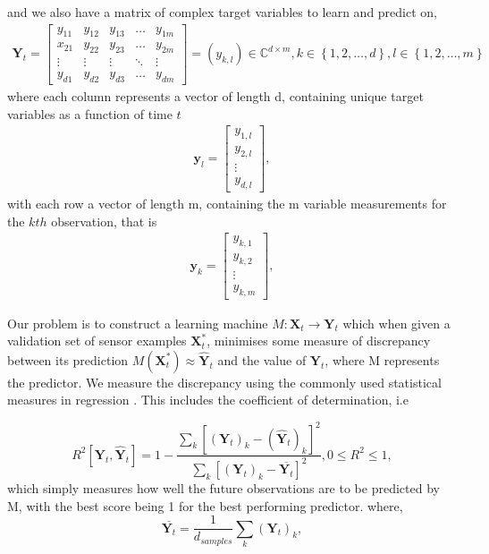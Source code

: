 and we also have a matrix of complex target variables to learn and predict on,
\begin{align*}
\textbf{Y}_{t}=\begin{bmatrix}
    y_{11} & y_{12} & y_{13} & \dots  & y_{1m} \\
    x_{21} & y_{22} & y_{23} & \dots  & y_{2m} \\
    \vdots & \vdots & \vdots & \ddots & \vdots \\
    y_{d1} & y_{d2} & y_{d3} & \dots  & y_{dm}
\end{bmatrix}=(y_{k,l}) \in  \mathbb{C}^{d \times m},  k\in \left\{1,2,\dots, d\right\}, l \in \left\{1,2,\dots,m\right\}
\end{align*}
where each column represents a vector of length d, containing unique target variables as a function of time $t$
\begin{align*}
\textbf{y}_{l}=\begin{bmatrix}
    y_{1,l}  \\
    y_{2,l} \\
    \vdots \\
    y_{d,l} 
\end{bmatrix},
\end{align*} 
with each row a vector of length m, containing the m variable measurements for the $kth$ observation, that is 
\begin{align*}
\textbf{y}_k=\begin{bmatrix}
    y_{k,1}  \\
    y_{k,2} \\
    \vdots \\
    y_{k,m} 
\end{bmatrix},
\end{align*}
 
Our problem is to construct a learning machine $M:\textbf{X}_{t} \rightarrow \textbf{Y}_{t}$ which when given a validation set of sensor examples $\textbf{X}^*_{t}$, minimises some measure of discrepancy between its prediction $M(\textbf{X}^*_{t})\approx\widehat{\textbf{Y}}_{t}$ and the value of $\textbf{Y}_{t}$, where M represents the predictor. We measure the discrepancy using the commonly used statistical measures in regression \citep{borchani2015survey}. This includes the coefficient of determination, i.e

\begin{equation}
R^2\left[\textbf{Y}_{t},\widehat{\textbf{Y}}_{t}\right]=1-\frac{\sum_{k} \left[(\textbf{Y}_{t})_{k}-(\widehat{\textbf{Y}}_{t})_{k}\right]^2}{\sum_{k}\left[(\textbf{Y}_{t})_{k}-\overline{\textbf{Y}_{t}}\right]^2}, 0 \leq R^2 \leq 1,
\label{R2score}
\end{equation}
which simply measures how well the future observations are to be predicted by M, with the best score being 1 for the best performing predictor. 
where,  \begin{equation}
\overline{\textbf{Y}_{t}}=\frac{1}{d_{samples}} \sum_{k} (\textbf{Y}_{t})_{k},
\end{equation} 

